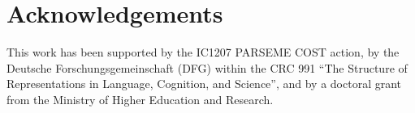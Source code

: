 \documentclass[output=paper
,modfonts
,nonflat
,biblatexbackend=biber
]{langsci/langscibook}
\begin{document}
\section*{Acknowledgements}
This work has been supported by the IC1207 PARSEME COST action, by the Deutsche Forschungsgemeinschaft
(DFG) within the CRC 991 ``The Structure of Representations in Language, Cognition, and Science'', and by a doctoral grant from the  Ministry of Higher Education and Research.

{\sloppy\printbibliography[heading=subbibliography,notkeyword=this]}
\end{document}
